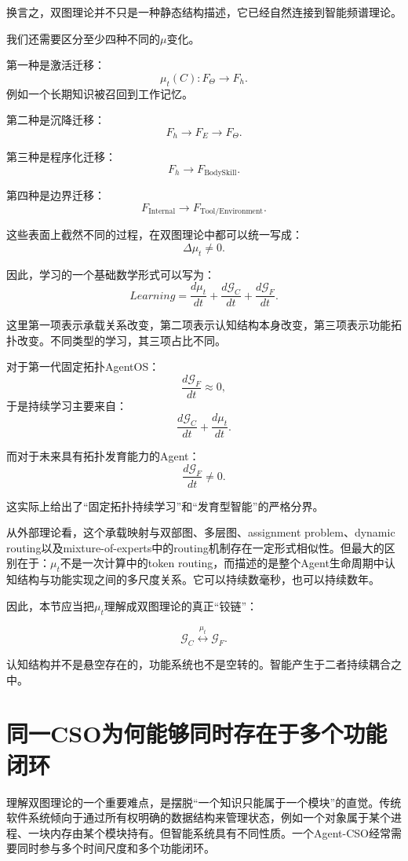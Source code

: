 换言之，双图理论并不只是一种静态结构描述，它已经自然连接到智能频谱理论。

我们还需要区分至少四种不同的$\mu$变化。

第一种是激活迁移：
\[
\mu_t(C)
:
F_{\Theta}
\rightarrow
F_h.
\]
例如一个长期知识被召回到工作记忆。

第二种是沉降迁移：
\[
F_h
\rightarrow
F_E
\rightarrow
F_\Theta.
\]

第三种是程序化迁移：
\[
F_h
\rightarrow
F_{\text{BodySkill}}.
\]

第四种是边界迁移：
\[
F_{\text{Internal}}
\rightarrow
F_{\text{Tool/Environment}}.
\]

这些表面上截然不同的过程，在双图理论中都可以统一写成：
\[
\boxed{
\Delta\mu_t\neq0.
}
\]

因此，学习的一个基础数学形式可以写为：
\[
\boxed{
Learning
=
\frac{d\mu_t}{dt}
+
\frac{d\mathcal G_C}{dt}
+
\frac{d\mathcal G_F}{dt}.
}
\]

这里第一项表示承载关系改变，第二项表示认知结构本身改变，第三项表示功能拓扑改变。不同类型的学习，其三项占比不同。

对于第一代固定拓扑AgentOS：
\[
\frac{d\mathcal G_F}{dt}\approx0,
\]
于是持续学习主要来自：
\[
\frac{d\mathcal G_C}{dt}
+
\frac{d\mu_t}{dt}.
\]

而对于未来具有拓扑发育能力的Agent：
\[
\frac{d\mathcal G_F}{dt}\neq0.
\]

这实际上给出了“固定拓扑持续学习”和“发育型智能”的严格分界。

从外部理论看，这个承载映射与双部图、多层图、assignment problem、dynamic routing以及mixture-of-experts中的routing机制存在一定形式相似性。但最大的区别在于：$\mu_t$不是一次计算中的token routing，而描述的是整个Agent生命周期中认知结构与功能实现之间的多尺度关系。它可以持续数毫秒，也可以持续数年。

因此，本节应当把$\mu_t$理解成双图理论的真正“铰链”：

\[
\boxed{
\mathcal G_C
\overset{\mu_t}{\longleftrightarrow}
\mathcal G_F.
}
\]

认知结构并不是悬空存在的，功能系统也不是空转的。智能产生于二者持续耦合之中。

\section{同一CSO为何能够同时存在于多个功能闭环}

理解双图理论的一个重要难点，是摆脱“一个知识只能属于一个模块”的直觉。传统软件系统倾向于通过所有权明确的数据结构来管理状态，例如一个对象属于某个进程、一块内存由某个模块持有。但智能系统具有不同性质。一个Agent-CSO经常需要同时参与多个时间尺度和多个功能闭环。

